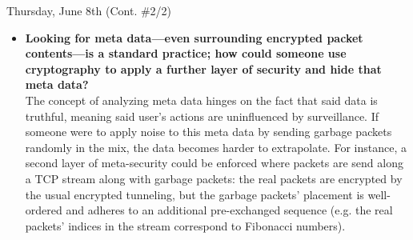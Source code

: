 \documentclass[11pt]{article}
\begin{document}
\begin{orangebox}{Thursday, June 8th (Cont. \#2/2)\vspace{-2.2em}\begin{flushright}\end{flushright}}
\begin{itemize}
    \item\textbf{Looking for meta data---even surrounding encrypted packet contents---is a standard practice; how could someone use cryptography to apply a further layer of security and hide that meta data?} \\
    \phantom{~~~~} The concept of analyzing meta data hinges on the fact that said data is truthful, meaning said user's actions are uninfluenced by surveillance. If someone were to apply noise to this meta data by sending garbage packets randomly in the mix, the data becomes harder to extrapolate. For instance, a second layer of meta-security could be enforced where packets are send along a TCP stream along with garbage packets: the real packets are encrypted by the usual encrypted tunneling, but the garbage packets' placement is well-ordered and adheres to an additional pre-exchanged sequence (e.g. the real packets' indices in the stream correspond to Fibonacci numbers).
\end{itemize}
\end{orangebox}

\begin{center}
\vspace{-0.25em}
\hspace{0.2cm}
\vspace{-0.4em}
\end{center}
\end{document}
